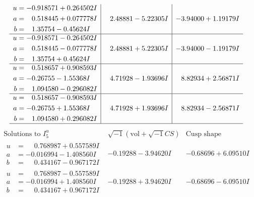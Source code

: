 \documentclass[1p]{elsarticle_modified}
\theoremstyle{definition}
\newcommand{\I}{\sqrt{-1}}
\begin{document}
$$\begin{array}{c|c|c}
\begin{aligned}
u &= -0.918571 + 0.264502 I \\
a &= \phantom{-}0.518445 + 0.077778 I \\
b &= \phantom{-}1.35754 - 0.45624 I\end{aligned}
 & \phantom{-}2.48881 - 5.22305 I & -3.94000 + 1.19179 I \\ \hline\begin{aligned}
u &= -0.918571 - 0.264502 I \\
a &= \phantom{-}0.518445 - 0.077778 I \\
b &= \phantom{-}1.35754 + 0.45624 I\end{aligned}
 & \phantom{-}2.48881 + 5.22305 I & -3.94000 - 1.19179 I \\ \hline\begin{aligned}
u &= \phantom{-}0.518657 + 0.908593 I \\
a &= -0.26755 - 1.55368 I \\
b &= \phantom{-}1.094580 - 0.296082 I\end{aligned}
 & \phantom{-}4.71928 - 1.93696 I & \phantom{-}8.82934 + 2.56871 I \\ \hline\begin{aligned}
u &= \phantom{-}0.518657 - 0.908593 I \\
a &= -0.26755 + 1.55368 I \\
b &= \phantom{-}1.094580 + 0.296082 I\end{aligned}
 & \phantom{-}4.71928 + 1.93696 I & \phantom{-}8.82934 - 2.56871 I\\
 \hline 
 \end{array}$$\newpage$$\begin{array}{c|c|c}  
\text{Solutions to }I^u_{5}& \I (\text{vol} + \sqrt{-1}CS) & \text{Cusp shape}\\
 \hline 
\begin{aligned}
u &= \phantom{-}0.768987 + 0.557589 I \\
a &= -0.016994 - 1.408560 I \\
b &= \phantom{-}0.434167 - 0.967172 I\end{aligned}
 & -0.19288 - 3.94620 I & -0.68696 + 6.09510 I \\ \hline\begin{aligned}
u &= \phantom{-}0.768987 - 0.557589 I \\
a &= -0.016994 + 1.408560 I \\
b &= \phantom{-}0.434167 + 0.967172 I\end{aligned}
 & -0.19288 + 3.94620 I & -0.68696 - 6.09510 I \\ \hline\begin{aligned}

\end{aligned}
\end{array}$$
\end{document}
